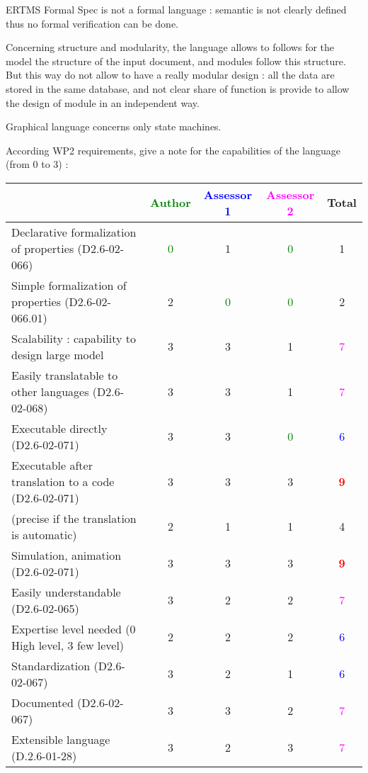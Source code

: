 \begin{assessor2}
ERTMS Formal Spec is not a formal language :  semantic is not clearly defined thus no formal verification can be done.

Concerning structure and modularity, the language allows to follows for the model the structure of the input document, and modules follow this structure. But this way do not allow to have a really modular design :  all the data are stored in the same database, and not clear share of function is provide to allow the design of module in an independent way.

Graphical language concerns only state machines.
\end{assessor2}

According WP2 requirements, give a note for the capabilities of the language (from 0 to 3) :

\begin{tabular}{|l | c | c | c | c|}
\hline
& \textcolor{green}{Author} & \textcolor{blue}{Assessor 1} & \textcolor{magenta}{Assessor 2} & Total \\
\hline
Declarative formalization of properties (D2.6-02-066) & \textcolor{green}{0} & 1    & \textcolor{green}{0} & 1    \\
\hline
Simple formalization of properties (D2.6-02-066.01) & 2    & \textcolor{green}{0} & \textcolor{green}{0} & 2    \\
\hline
Scalability : capability to design large model & 3    & 3    & 1    & \textcolor{magenta}{7} \\
\hline
Easily translatable to other languages (D2.6-02-068) & 3    & 3    & 1    & \textcolor{magenta}{7} \\
\hline
Executable directly (D2.6-02-071) & 3    & 3    & \textcolor{green}{0} & \textcolor{blue}{6} \\
\hline
Executable after translation to a code (D2.6-02-071) & 3    & 3    & 3    & \textcolor{red}{\textbf{9}} \\
(precise if the translation is automatic) & 2    & 1    & 1    & 4    \\
\hline
Simulation, animation (D2.6-02-071) & 3    & 3    & 3    & \textcolor{red}{\textbf{9}} \\
\hline
Easily understandable (D2.6-02-065) & 3    & 2    & 2    & \textcolor{magenta}{7} \\
\hline
Expertise level needed (0 High level, 3 few level) & 2    & 2    & 2    & \textcolor{blue}{6} \\
\hline
Standardization (D2.6-02-067) & 3    & 2    & 1    & \textcolor{blue}{6} \\
\hline
Documented (D2.6-02-067) & 3    & 3    & 2    & \textcolor{magenta}{7} \\
\hline
Extensible language (D.2.6-01-28) & 3    & 2    & 3    & \textcolor{magenta}{7} \\
\hline
\end{tabular}

